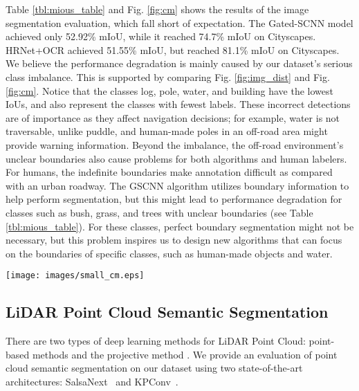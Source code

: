 \documentclass[letterpaper, 10 pt, conference]{ieeeconf}
\begin{document}
Table \ref{tbl:mious_table} and Fig. \ref{fig:cm} shows the results of the image segmentation evaluation, which fall short of expectation. The Gated-SCNN model achieved only 52.92\% mIoU, while it reached 74.7\% mIoU \cite{Takikawa2019} on Cityscapes. HRNet+OCR achieved 51.55\% mIoU, but reached 81.1\% mIoU on Cityscapes. We believe the performance degradation is mainly caused by our dataset's serious class imbalance. This is supported by comparing Fig. \ref{fig:img_dist} and Fig. \ref{fig:cm}. Notice that the classes log, pole, water, and building have the lowest IoUs, and also represent the classes with fewest labels. These incorrect detections are of importance as they affect navigation decisions; for example, water is not traversable, unlike puddle, and human-made poles in an off-road area might provide warning information. Beyond the imbalance, the off-road environment's unclear boundaries also cause problems for both algorithms and human labelers. For humans, the indefinite boundaries make annotation difficult as compared with an urban roadway. The GSCNN algorithm utilizes boundary information to help perform segmentation, but this might lead to performance degradation for classes such as bush, grass, and trees with unclear boundaries (see Table \ref{tbl:mious_table}). For these classes, perfect boundary segmentation might not be necessary, but this problem inspires us to design new algorithms that can focus on the boundaries of specific classes, such as human-made objects and water.


\begin{figure*}
\vspace{5pt}
  \centering
  \texttt{[image: images/small\_cm.eps]}
  \caption{Confusion matrix. The y and x axis numbers represent classes ids (1: sky; 2: grass; 3: tree; 4: bush; 5: concrete; 6: mud; 7: person; 8: puddle; 9: rubble; 10: barrier; 11: log; 12: fence; 13: vehicle; 14: object; 15: pole; 16: water; 17: asphalt;18: building; 19: void.) Note that the sky label is omitted for the point cloud algorithm confusion matrices.}   
  \label{fig:cm}
\end{figure*} \subsection{LiDAR Point Cloud Semantic Segmentation}
There are two types of deep learning methods for LiDAR Point Cloud: point-based methods and the projective method \cite{Guo2020}. We provide an evaluation of point cloud semantic segmentation on our dataset using two state-of-the-art architectures: SalsaNext~\cite{Cortinhal2020} and KPConv~\cite{Thomas2019}.
\end{document}
